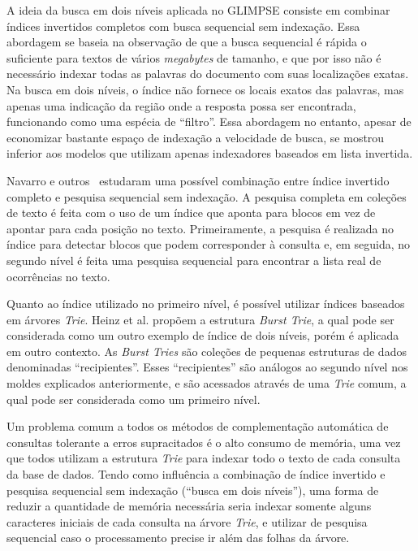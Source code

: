 A ideia da busca em dois níveis aplicada no GLIMPSE consiste em combinar índices invertidos completos com busca sequencial sem indexação. Essa abordagem se baseia na observação de que a busca sequencial é rápida o suficiente para textos de vários \textit{megabytes} de tamanho, e que por isso não é necessário indexar todas as palavras do documento com suas localizações exatas. Na busca em dois níveis, o índice não fornece os locais exatos das palavras, mas apenas uma indicação da região onde a resposta possa ser encontrada, funcionando como uma espécia de ``filtro''. Essa abordagem no entanto, apesar de economizar bastante espaço de indexação a velocidade de busca, se mostrou inferior aos modelos que utilizam apenas indexadores baseados em lista invertida.

Navarro e outros~\citep{navarro2000adding}  estudaram uma possível combinação entre índice invertido completo e pesquisa sequencial sem indexação. A pesquisa completa em coleções de texto é feita com o uso de um índice que aponta para blocos em vez de apontar para cada posição no texto. Primeiramente, a pesquisa é realizada no índice para detectar blocos que podem corresponder à consulta e, em seguida, no segundo nível é feita uma pesquisa sequencial para encontrar a lista real de
ocorrências no texto.

Quanto ao índice utilizado no primeiro nível, é possível utilizar índices baseados em árvores \textit{Trie}. Heinz et al. \citep{heinz2002burst} propõem a estrutura \textit{Burst Trie}, a qual pode ser considerada como um outro exemplo de índice de dois níveis, porém é aplicada em outro contexto. As \textit{Burst \textit{Trie}s} são coleções de pequenas estruturas de dados denominadas ``recipientes''. Esses ``recipientes'' são análogos ao segundo nível nos moldes explicados anteriormente, e são acessados através de uma \textit{Trie} comum, a qual pode ser considerada como um primeiro nível.

Um problema comum a todos os métodos de complementação automática de consultas tolerante a erros supracitados é o alto consumo de memória, uma vez que todos utilizam a estrutura \textit{Trie} para indexar todo o texto de cada consulta da base de dados. Tendo como influência a combinação de índice invertido e pesquisa sequencial sem indexação (``busca em dois níveis''), uma forma de reduzir a quantidade de memória necessária seria indexar somente alguns caracteres iniciais de cada consulta na árvore \textit{Trie}, e utilizar de pesquisa sequencial caso o processamento precise ir além das folhas da árvore. 

